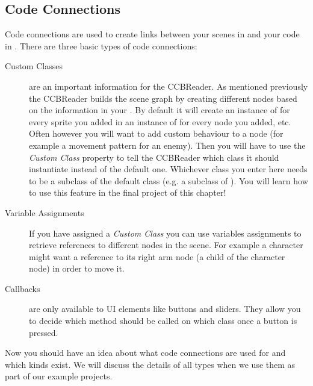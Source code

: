 \subsection{Code Connections}
\label{CodeConnections}
Code connections are used to create links between your scenes in \SB{} and your
code in \xcode{}. There are three basic types of code connections:
\begin{description}
\item[Custom Classes] are an important information for the CCBReader. As
mentioned previously the CCBReader builds the scene graph by creating different
nodes based on the information in your \ccbfile{}. By default it will create an
instance of \ccsprite{} for every sprite you added in \SB{} an instance of \ccnode{} for every node you added, etc. Often
however you will want to add custom behaviour to a node (for example a movement
pattern for an enemy). Then you will have to use the \textit{Custom Class}
property to tell the CCBReader which class it should instantiate instead of the
default one. Whichever class you enter here needs to be a subclass of the
default class (e.g. a subclass of \ccsprite{}). You will learn how to use this
feature in the final project of this chapter!
\item[Variable Assignments] If you have assigned a \textit{Custom Class} you can
use variables assignments to retrieve references to different nodes in the
scene. For example a character might want a reference to its right arm node (a
child of the character node) in order to move it. 
\item[Callbacks] are only available to UI elements like buttons and sliders.
They allow you to decide which method should be called on which class once a
button is pressed.
\end{description}
Now you should have an idea about what code connections are used for and which
kinds exist. We will discuss the details of all types when we use them as part
of our example projects.

